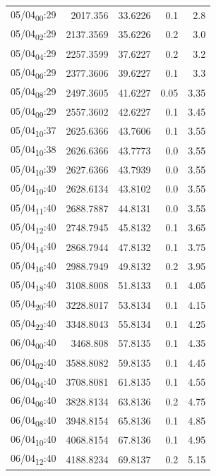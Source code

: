 \documentclass[11pt]{article}
\begin{document}
\begin{center}
\begin{tabular}{lrrrr}
05/04\textsubscript{00}:29 & 2017.356 & 33.6226 & 0.1 & 2.8\\[0pt]
05/04\textsubscript{02}:29 & 2137.3569 & 35.6226 & 0.2 & 3.0\\[0pt]
05/04\textsubscript{04}:29 & 2257.3599 & 37.6227 & 0.2 & 3.2\\[0pt]
05/04\textsubscript{06}:29 & 2377.3606 & 39.6227 & 0.1 & 3.3\\[0pt]
05/04\textsubscript{08}:29 & 2497.3605 & 41.6227 & 0.05 & 3.35\\[0pt]
05/04\textsubscript{09}:29 & 2557.3602 & 42.6227 & 0.1 & 3.45\\[0pt]
05/04\textsubscript{10}:37 & 2625.6366 & 43.7606 & 0.1 & 3.55\\[0pt]
05/04\textsubscript{10}:38 & 2626.6366 & 43.7773 & 0.0 & 3.55\\[0pt]
05/04\textsubscript{10}:39 & 2627.6366 & 43.7939 & 0.0 & 3.55\\[0pt]
05/04\textsubscript{10}:40 & 2628.6134 & 43.8102 & 0.0 & 3.55\\[0pt]
05/04\textsubscript{11}:40 & 2688.7887 & 44.8131 & 0.0 & 3.55\\[0pt]
05/04\textsubscript{12}:40 & 2748.7945 & 45.8132 & 0.1 & 3.65\\[0pt]
05/04\textsubscript{14}:40 & 2868.7944 & 47.8132 & 0.1 & 3.75\\[0pt]
05/04\textsubscript{16}:40 & 2988.7949 & 49.8132 & 0.2 & 3.95\\[0pt]
05/04\textsubscript{18}:40 & 3108.8008 & 51.8133 & 0.1 & 4.05\\[0pt]
05/04\textsubscript{20}:40 & 3228.8017 & 53.8134 & 0.1 & 4.15\\[0pt]
05/04\textsubscript{22}:40 & 3348.8043 & 55.8134 & 0.1 & 4.25\\[0pt]
06/04\textsubscript{00}:40 & 3468.808 & 57.8135 & 0.1 & 4.35\\[0pt]
06/04\textsubscript{02}:40 & 3588.8082 & 59.8135 & 0.1 & 4.45\\[0pt]
06/04\textsubscript{04}:40 & 3708.8081 & 61.8135 & 0.1 & 4.55\\[0pt]
06/04\textsubscript{06}:40 & 3828.8134 & 63.8136 & 0.2 & 4.75\\[0pt]
06/04\textsubscript{08}:40 & 3948.8154 & 65.8136 & 0.1 & 4.85\\[0pt]
06/04\textsubscript{10}:40 & 4068.8154 & 67.8136 & 0.1 & 4.95\\[0pt]
06/04\textsubscript{12}:40 & 4188.8234 & 69.8137 & 0.2 & 5.15\\[0pt]

\end{tabular}
\end{center}
\end{document}
